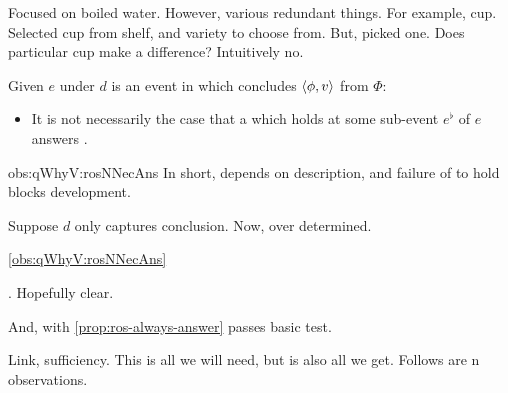 \begin{note}
  Focused on boiled water.
  However, various redundant things.
  For example, cup.
  Selected cup from shelf, and variety to choose from.
  But, picked one.
  Does particular cup make a difference?
  Intuitively no.

  \begin{observation}
    \label{obs:qWhyV:rosNNecAns}
    \medskip

    Given \(e\) under \(d\) is an event in which \vAgent{} concludes \(\langle \phi, v \rangle\) from \(\Phi\):
    \begin{itemize}
    \item
      It is not necessarily the case that a \ros{} which holds at some sub-event \(e^{\flat}\) of \(e\) answers \qWhyV{}.
    \end{itemize}
    \vspace{-\baselineskip}
  \end{observation}

  \begin{motivation}{obs:qWhyV:rosNNecAns}
    In short, depends on description, and failure of \ros{} to hold blocks development.

    Suppose \(d\) only captures conclusion.
    Now, over determined.
  \end{motivation}

  \autoref{obs:qWhyV:rosNNecAns}
\end{note}

\begin{note}
  \qWhyV{}.
  Hopefully clear.

  And, with \autoref{prop:ros-always-answer} passes basic test.

  Link, sufficiency.
  This is all we will need, but is also all we get.
  Follows are {
    \color{red}
    n
  }
  observations.
\end{note}

